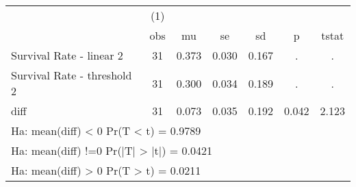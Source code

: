 {
\def\sym#1{\ifmmode^{#1}\else\(^{#1}\)\fi}
\begin{tabular}{l*{1}{cccccc}}
\hline\hline
                    &\multicolumn{1}{c}{(1)}&            &            &            &            &            \\
                    &         obs&          mu&          se&          sd&           p&       tstat\\
\hline
Survival Rate - linear 2&          31&       0.373&       0.030&       0.167&           .&           .\\
Survival Rate - threshold 2&          31&       0.300&       0.034&       0.189&           .&           .\\
diff                &          31&       0.073&       0.035&       0.192&       0.042&       2.123\\
\hline\hline
\multicolumn{7}{l}{\footnotesize Ha: mean(diff) < 0   Pr(T < t) = 0.9789}\\
\multicolumn{7}{l}{\footnotesize Ha: mean(diff) !=0   Pr(|T| > |t|) = 0.0421}\\
\multicolumn{7}{l}{\footnotesize Ha: mean(diff) > 0   Pr(T > t) = 0.0211}\\
\end{tabular}
}
